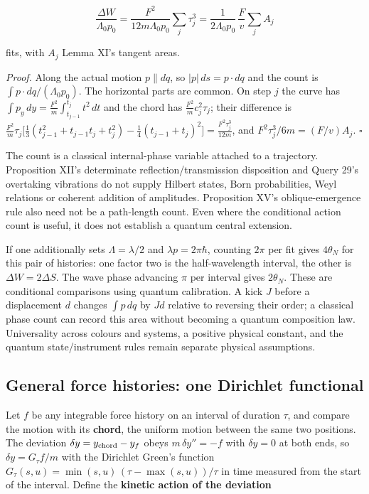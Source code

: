 \documentclass[11pt,a4paper]{article}
\begin{document}
\[\frac{\Delta W}{\Lambda_0p_0}=\frac{F^2}{12m\Lambda_0p_0}\sum_j\tau_j^3
=\frac{1}{2\Lambda_0p_0}\,\frac{F}{v}\sum_jA_j\]

fits, with \(A_j\) Lemma XI's tangent areas.

\emph{Proof.} Along the actual motion \(p\parallel dq\), so
\(|p|\,ds=p\cdot dq\) and the count is
\(\int p\cdot dq/(\Lambda_0p_0)\). The horizontal parts are common. On
step \(j\) the curve has
\(\int p_y\,dy=\frac{F^2}{m}\int_{t_{j-1}}^{t_j}t^2\,dt\) and the chord
has \(\frac{F^2}{m}c_j^2\tau_j\); their difference is
\(\frac{F^2}{m}\tau_j\bigl[\frac13(t_{j-1}^2+t_{j-1}t_j+t_j^2)-\frac14(t_{j-1}+t_j)^2\bigr] =\frac{F^2\tau_j^3}{12m}\),
and \(F^2\tau_j^3/6m=(F/v)A_j\). \(\square\)

The count is a classical internal-phase variable attached to a
trajectory. Proposition XII's determinate reflection/transmission
disposition and Query 29's overtaking vibrations do not supply Hilbert
states, Born probabilities, Weyl relations or coherent addition of
amplitudes. Proposition XV's oblique-emergence rule also need not be a
path-length count. Even where the conditional action count is useful, it
does not establish a quantum central extension.

If one additionally sets \(\Lambda=\lambda/2\) and
\(\lambda p=2\pi\hbar\), counting \(2\pi\) per fit gives \(4\theta_N\)
for this pair of histories: one factor two is the half-wavelength
interval, the other is \(\Delta W=2\Delta S\). The wave phase advancing
\(\pi\) per interval gives \(2\theta_N\). These are conditional
comparisons using quantum calibration. A kick \(J\) before a
displacement \(d\) changes \(\int p\,dq\) by \(Jd\) relative to
reversing their order; a classical phase count can record this area
without becoming a quantum composition law. Universality across colours
and systems, a positive physical constant, and the quantum
state/instrument rules remain separate physical assumptions.

\hypertarget{general-force-histories-one-dirichlet-functional}{%
\subsection{General force histories: one Dirichlet
functional}\label{general-force-histories-one-dirichlet-functional}}

Let \(f\) be any integrable force history on an interval of duration
\(\tau\), and compare the motion with its \textbf{chord}, the uniform
motion between the same two positions. The deviation
\(\delta y=y_{\rm chord}-y_f\) obeys \(m\,\delta y''=-f\) with
\(\delta y=0\) at both ends, so \(\delta y=G_\tau f/m\) with the
Dirichlet Green's function
\(G_\tau(s,u)=\min(s,u)\,(\tau-\max(s,u))/\tau\) in time measured from
the start of the interval. Define the \textbf{kinetic action of the
deviation}
\end{document}
